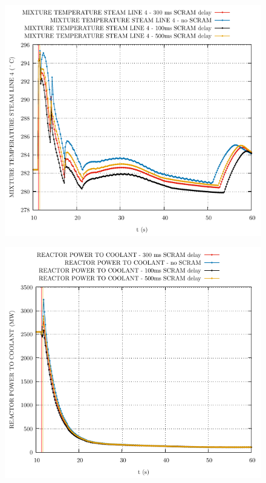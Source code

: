 \documentclass{article}
\begin{document}
\begin{multicols}{2}
\begin{figure}[H]
\end{figure}
\begin{figure}[H]
\centering
\includegraphics[width=\columnwidth]{./graphs/MIXTURE TEMPERATURE STEAM LINE 4_comp.pdf}
\end{figure}
\begin{figure}[H]
\centering
\includegraphics[width=\columnwidth]{./graphs/REACTOR POWER TO COOLANT_comp.pdf}

\end{figure}
\end{multicols}
\end{document}
